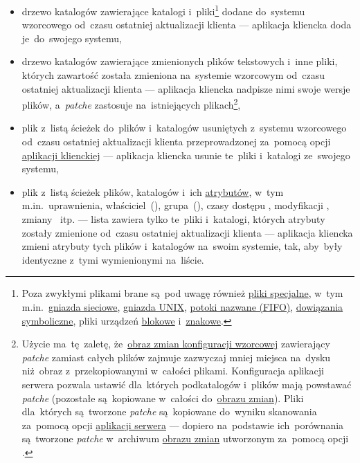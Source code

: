 \documentclass[thesis]{subfiles}
\begin{document}
\begin{itemize}
	\item drzewo katalogów  zawierające katalogi i~pliki\footnote{Poza zwykłymi plikami brane są~pod uwagę również \href{https://en.wikipedia.org/wiki/Unix_file_types}{pliki specjalne}, w~tym m.in.~\href{https://en.wikipedia.org/wiki/Network_socket}{gniazda sieciowe}, \href{https://en.wikipedia.org/wiki/Unix_domain_socket}{gniazda UNIX}, \href{https://en.wikipedia.org/wiki/Named_pipe}{potoki nazwane (FIFO)}, \href{https://en.wikipedia.org/wiki/Symbolic_link}{dowiązania symboliczne}, pliki urządzeń \href{https://en.wikipedia.org/wiki/Device_file\#Block_devices}{blokowe} i~\href{https://en.wikipedia.org/wiki/Device_file\#Character_devices}{znakowe}.} dodane do~systemu wzorcowego od~czasu ostatniej aktualizacji klienta --- aplikacja kliencka doda je~do~swojego systemu,
	\item drzewo katalogów  zawierające  zmienionych plików tekstowych i~inne pliki, których zawartość została zmieniona na~systemie wzorcowym od~czasu ostatniej aktualizacji klienta --- aplikacja kliencka nadpisze nimi swoje wersje plików, a~\emph{patche} zastosuje na~istniejących plikach\footnote{Użycie  ma~tę~zaletę, że~\hyperref[sec:obraz-zmian-konfiguracji]{obraz zmian konfiguracji wzorcowej} zawierający \emph{patche} zamiast całych plików zajmuje zazwyczaj mniej miejsca na~dysku niż~obraz z~przekopiowanymi w~całości plikami. Konfiguracja aplikacji serwera pozwala ustawić dla~których podkatalogów i~plików mają powstawać \emph{patche} (pozostałe są~kopiowane w~całości do~\hyperref[sec:obraz-zmian-konfiguracji]{obrazu zmian}). Pliki dla~których są~tworzone \emph{patche} są~kopiowane do~wyniku skanowania za~pomocą opcji  \hyperref[sec:srv-app]{aplikacji serwera} --- dopiero na~podstawie ich~porównania są~tworzone \emph{patche} w~archiwum \hyperref[sec:obraz-zmian-konfiguracji]{obrazu zmian} utworzonym za~pomocą opcji .},
	\item plik  z~listą ścieżek do~plików i~katalogów usuniętych z~systemu wzorcowego od~czasu ostatniej aktualizacji klienta przeprowadzonej za~pomocą opcji  \hyperref[sec:cli-app]{aplikacji klienckiej} --- aplikacja kliencka usunie te~pliki i~katalogi ze~swojego systemu,
	\item plik  z~listą ścieżek plików, katalogów i~ich \href{https://serverfault.com/a/584102/289017}{atrybutów}, w~tym m.in.~uprawnienia, właściciel~(), grupa~(), czasy dostępu , modyfikacji , zmiany ~itp. --- lista zawiera tylko te~pliki i~katalogi, których atrybuty zostały zmienione od~czasu ostatniej aktualizacji klienta --- aplikacja kliencka zmieni atrybuty tych plików i~katalogów na~swoim systemie, tak, aby~były identyczne z~tymi wymienionymi na~liście.

\end{itemize}
\end{document}
